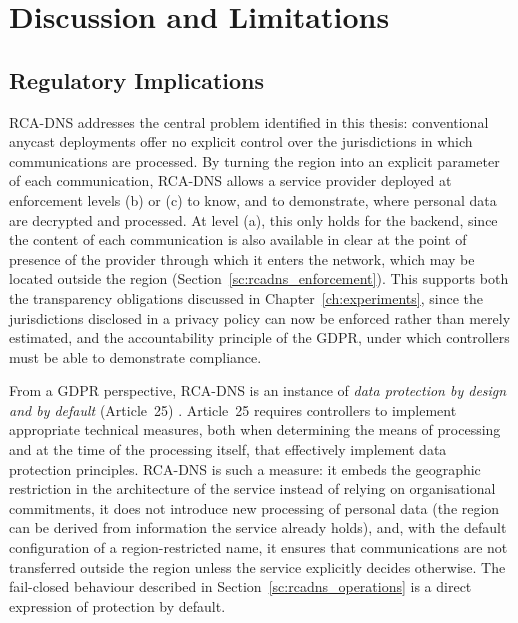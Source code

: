 \section{Discussion and Limitations}
\label{sc:rcadns_discussion}

\subsection{Regulatory Implications}
\label{sc:rcadns_discussion_regulatory}

RCA-DNS addresses the central problem identified in this thesis: conventional anycast deployments offer no explicit control over the jurisdictions in which communications are processed. By turning the region into an explicit parameter of each communication, RCA-DNS allows a service provider deployed at enforcement levels (b) or (c) to know, and to demonstrate, where personal data are decrypted and processed. At level (a), this only holds for the backend, since the content of each communication is also available in clear at the point of presence of the provider through which it enters the network, which may be located outside the region (Section~\ref{sc:rcadns_enforcement}). This supports both the transparency obligations discussed in Chapter~\ref{ch:experiments}, since the jurisdictions disclosed in a privacy policy can now be enforced rather than merely estimated, and the accountability principle of the GDPR, under which controllers must be able to demonstrate compliance.

From a GDPR perspective, RCA-DNS is an instance of \textit{data protection by design and by default} (Article~25) \cite{REGULATIONSRelevance, GuidelinesBoard}. Article~25 requires controllers to implement appropriate technical measures, both when determining the means of processing and at the time of the processing itself, that effectively implement data protection principles. RCA-DNS is such a measure: it embeds the geographic restriction in the architecture of the service instead of relying on organisational commitments, it does not introduce new processing of personal data (the region can be derived from information the service already holds), and, with the default configuration of a region-restricted name, it ensures that communications are not transferred outside the region unless the service explicitly decides otherwise. The fail-closed behaviour described in Section~\ref{sc:rcadns_operations} is a direct expression of protection by default.

